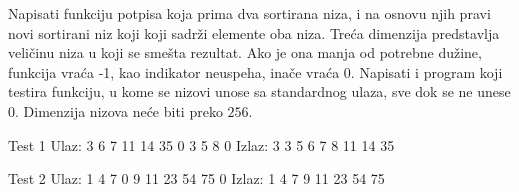 \begin{Exercise}[label=505]
  Napisati funkciju potpisa  koja prima dva sortirana
  niza, i na osnovu njih pravi novi sortirani niz koji koji sadrži
  elemente oba niza. Treća dimenzija predstavlja veličinu niza u koji
  se smešta rezultat. Ako je ona manja od potrebne dužine, funkcija
  vraća -1, kao indikator neuspeha, inače vraća 0. Napisati i program
  koji testira funkciju, u kome se nizovi unose sa standardnog ulaza,
  sve dok se ne unese 0. Dimenzija nizova neće biti preko $256$.
  
\begin{miditest}
\begin{test}{Test 1}
Ulaz:   3 6 7 11 14 35 0 3 5 8 0
Izlaz:  3 3 5 6 7 8 11 14 35
\end{test}
\end{miditest}

\begin{miditest}
\begin{test}{Test 2}
Ulaz:   1 4 7 0 9 11 23 54 75 0
Izlaz:  1 4 7 9 11 23 54 75
\end{test}
\end{miditest}
  
\end{Exercise}

